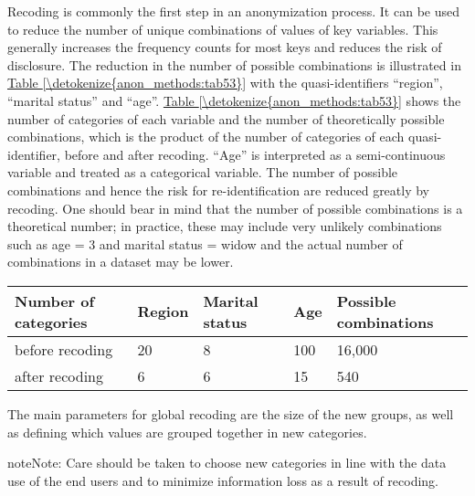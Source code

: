 \documentclass[letterpaper,10pt,english]{sphinxmanual}
\begin{document}
Recoding is commonly the first step in an anonymization process. It can
be used to reduce the number of unique combinations of values of key
variables. This generally increases the frequency counts for most keys
and reduces the risk of disclosure. The reduction in the number of
possible combinations is illustrated in \hyperref[\detokenize{anon_methods:tab53}]{Table \ref{\detokenize{anon_methods:tab53}}} with the
quasi-identifiers “region”, “marital status” and “age”. \hyperref[\detokenize{anon_methods:tab53}]{Table \ref{\detokenize{anon_methods:tab53}}} shows
the number of categories of each variable and the number of
theoretically possible combinations, which is the product of the number
of categories of each quasi-identifier, before and after recoding. “Age”
is interpreted as a semi-continuous variable and treated as a
categorical variable. The number of possible combinations and hence the
risk for re-identification are reduced greatly by recoding. One should
bear in mind that the number of possible combinations is a theoretical
number; in practice, these may include very unlikely combinations such
as age = 3 and marital status = widow and the actual number of
combinations in a dataset may be lower.


\begin{savenotes}\sphinxattablestart
\centering
{}
\label{\detokenize{anon_methods:tab53}}\label{\detokenize{anon_methods:id27}}
\sphinxaftercaption
\begin{tabulary}{\linewidth}[t]{|T|T|T|T|T|}
\hline
\sphinxstyletheadfamily 
Number of categories
&\sphinxstyletheadfamily 
Region
&\sphinxstyletheadfamily 
Marital status
&\sphinxstyletheadfamily 
Age
&\sphinxstyletheadfamily 
Possible combinations
\\
\hline
before recoding
&
20
&
8
&
100
&
16,000
\\
\hline
after recoding
&
6
&
6
&
15
&
540
\\
\hline
\end{tabulary}
\par
\sphinxattableend\end{savenotes}

The main parameters for global recoding are the size of the new groups,
as well as defining which values are grouped together in new categories.

\begin{sphinxadmonition}{note}{Note:}
Care should be taken to choose new categories in line with the
data use of the end users and to minimize information loss as a result
of recoding.
\end{sphinxadmonition}
\end{document}
